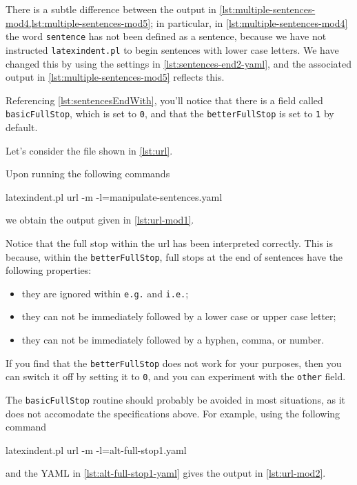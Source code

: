 	There is a subtle difference between the output in \cref{lst:multiple-sentences-mod4,lst:multiple-sentences-mod5}; in particular,
	in \cref{lst:multiple-sentences-mod4} the word \texttt{sentence} has not been defined as a sentence, because we have not instructed
	\texttt{latexindent.pl} to begin sentences with lower case letters. We have changed this by using the settings in \cref{lst:sentences-end2-yaml},
	and the associated output in \cref{lst:multiple-sentences-mod5} reflects this.

	Referencing \vref{lst:sentencesEndWith}, you'll notice that there is a field called \texttt{basicFullStop}, which
	is set to \texttt{0}, and that the \texttt{betterFullStop} is set to \texttt{1} by default.

	Let's consider the file shown in \cref{lst:url}.


	Upon running the following commands
	\begin{commandshell}
latexindent.pl url -m -l=manipulate-sentences.yaml
\end{commandshell}
	we obtain the output given in \cref{lst:url-mod1}.


	Notice that the full stop within the url has been interpreted correctly. This is because, within the \texttt{betterFullStop},
	full stops at the end of sentences have the following properties:
	\begin{itemize}
		\item they are ignored within \texttt{e.g.} and \texttt{i.e.};
		\item they can not be immediately followed by a lower case or upper case letter;
		\item they can not be immediately followed by a hyphen, comma, or number.
	\end{itemize}
	If you find that the \texttt{betterFullStop} does not work for your purposes, then you can switch it off by setting
	it to \texttt{0}, and you can experiment with the \texttt{other} field.

	The \texttt{basicFullStop} routine should probably be avoided in most situations, as it does not accomodate the specifications
	above. For example, using the following command
	\begin{commandshell}
latexindent.pl url -m -l=alt-full-stop1.yaml
\end{commandshell}
	and the YAML in \cref{lst:alt-full-stop1-yaml} gives the output in \cref{lst:url-mod2}.

